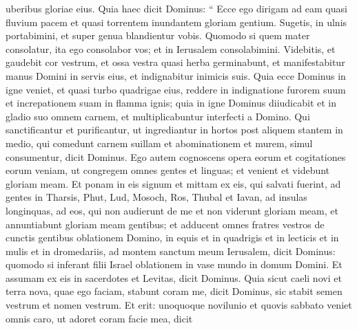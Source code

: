 \begin{biblechapter}
\begin{biblechapter}
\begin{biblechapter}
\begin{biblechapter}
\begin{biblechapter}
\begin{biblechapter}
\begin{biblechapter}
\begin{biblechapter}
\begin{biblechapter}
\begin{biblechapter}
\begin{biblechapter}
\begin{biblechapter}
\begin{biblechapter}
\begin{biblechapter}
\begin{biblechapter}
\begin{biblechapter}
\begin{biblechapter}
\begin{biblechapter}
\begin{biblechapter}
\begin{biblechapter}
\begin{biblechapter}
\begin{biblechapter}
\begin{biblechapter}
\begin{biblechapter}
\begin{biblechapter}
\begin{biblechapter}
\begin{biblechapter}
\begin{biblechapter}
\begin{biblechapter}
\begin{biblechapter}
\begin{biblechapter}
\begin{biblechapter}
\begin{biblechapter}
\begin{biblechapter}
\begin{biblechapter}
\begin{biblechapter}
\begin{biblechapter}
\begin{biblechapter}
\begin{biblechapter}
\begin{biblechapter}
\begin{biblechapter}
\begin{biblechapter}
\begin{biblechapter}
\begin{biblechapter}
\begin{biblechapter}
\begin{biblechapter}
\begin{biblechapter}
\begin{biblechapter}
\begin{biblechapter}
\begin{biblechapter}
\begin{biblechapter}
\begin{biblechapter}
\begin{biblechapter}
\begin{biblechapter}
\begin{biblechapter}
\begin{biblechapter}
\begin{biblechapter}
\begin{biblechapter}
\begin{biblechapter}
\begin{biblechapter}
\begin{biblechapter}
\begin{biblechapter}
\begin{biblechapter}
\begin{biblechapter}
\begin{biblechapter}
\begin{biblechapter}
uberibus gloriae eius.
 \verse Quia haec dicit Dominus:
 “ Ecce ego dirigam ad eam quasi fluvium pacem
 et quasi torrentem inundantem gloriam gentium.
 Sugetis, in ulnis portabimini,
 et super genua blandientur vobis.
 \verse Quomodo si quem mater consolatur,
 ita ego consolabor vos;
 et in Ierusalem consolabimini.
 \verse Videbitis, et gaudebit cor vestrum,
 et ossa vestra quasi herba germinabunt,
 et manifestabitur manus Domini in servis eius,
 et indignabitur inimicis suis.
 \verse Quia ecce Dominus in igne veniet,
 et quasi turbo quadrigae eius,
 reddere in indignatione furorem suum
 et increpationem suam in flamma ignis;
 \verse quia in igne Dominus diiudicabit
 et in gladio suo omnem carnem,
 et multiplicabuntur interfecti a Domino.
 \verse Qui sanctificantur et purificantur, ut ingrediantur
 in hortos post aliquem stantem in medio,
 qui comedunt carnem suillam
 et abominationem et murem,
 simul consumentur,
 dicit Dominus.
 \verse Ego autem cognoscens opera eorum et cogitationes eorum veniam, ut congregem omnes gentes et linguas; et venient et videbunt gloriam meam. 
\verse Et ponam in eis signum et mittam ex eis, qui salvati fuerint, ad gentes in Tharsis, Phut, Lud, Mosoch, Ros, Thubal et Iavan, ad insulas longinquas, ad eos, qui non audierunt de me et non viderunt gloriam meam, et annuntiabunt gloriam meam gentibus; 
\verse et adducent omnes fratres vestros de cunctis gentibus oblationem Domino, in equis et in quadrigis et in lecticis et in mulis et in dromedariis, ad montem sanctum meum Ierusalem, dicit Dominus: quomodo si inferant filii Israel oblationem in vase mundo in domum Domini. 
\verse Et assumam ex eis in sacerdotes et Levitas, dicit Dominus.
 \verse Quia sicut caeli novi
 et terra nova, quae ego faciam,
 stabunt coram me,
 dicit Dominus,
 sic stabit semen vestrum et nomen vestrum.
 \verse Et erit: unoquoque novilunio
 et quovis sabbato
 veniet omnis caro, ut adoret coram facie mea,
 dicit 
\end{biblechapter}
\end{biblechapter}
\end{biblechapter}
\end{biblechapter}
\end{biblechapter}
\end{biblechapter}
\end{biblechapter}
\end{biblechapter}
\end{biblechapter}
\end{biblechapter}
\end{biblechapter}
\end{biblechapter}
\end{biblechapter}
\end{biblechapter}
\end{biblechapter}
\end{biblechapter}
\end{biblechapter}
\end{biblechapter}
\end{biblechapter}
\end{biblechapter}
\end{biblechapter}
\end{biblechapter}
\end{biblechapter}
\end{biblechapter}
\end{biblechapter}
\end{biblechapter}
\end{biblechapter}
\end{biblechapter}
\end{biblechapter}
\end{biblechapter}
\end{biblechapter}
\end{biblechapter}
\end{biblechapter}
\end{biblechapter}
\end{biblechapter}
\end{biblechapter}
\end{biblechapter}
\end{biblechapter}
\end{biblechapter}
\end{biblechapter}
\end{biblechapter}
\end{biblechapter}
\end{biblechapter}
\end{biblechapter}
\end{biblechapter}
\end{biblechapter}
\end{biblechapter}
\end{biblechapter}
\end{biblechapter}
\end{biblechapter}
\end{biblechapter}
\end{biblechapter}
\end{biblechapter}
\end{biblechapter}
\end{biblechapter}
\end{biblechapter}
\end{biblechapter}
\end{biblechapter}
\end{biblechapter}
\end{biblechapter}
\end{biblechapter}
\end{biblechapter}
\end{biblechapter}
\end{biblechapter}
\end{biblechapter}
\end{biblechapter}
